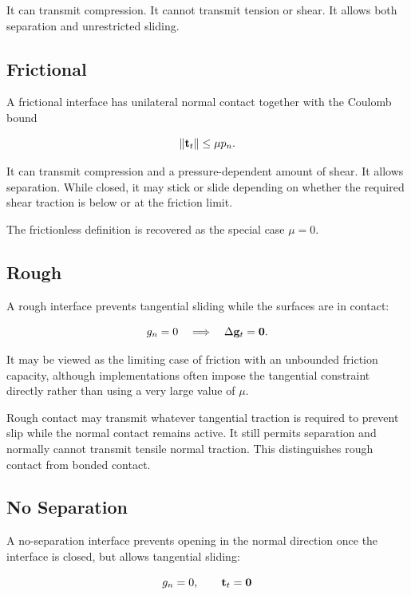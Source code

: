It can transmit compression. It cannot transmit tension or shear. It allows
both separation and unrestricted sliding.

\subsection{Frictional}

A frictional interface has unilateral normal contact together with the Coulomb
bound

\begin{equation}
    \| {\mathbf{t}_t} \| \leq \mu p_n.
\end{equation}

It can transmit compression and a pressure-dependent amount of shear. It allows
separation. While closed, it may stick or slide depending on whether the required
shear traction is below or at the friction limit.

The frictionless definition is recovered as the special case $ \mu=0 $.

\subsection{Rough}

A rough interface prevents tangential sliding while the surfaces are in contact:

\begin{equation}
    g_n=0 \quad \Longrightarrow \quad \Delta \mathbf{g}_t=\mathbf{0}.
\end{equation}

It may be viewed as the limiting case of friction with an unbounded friction
capacity, although implementations often impose the tangential constraint
directly rather than using a very large value of $ \mu $.

Rough contact may transmit whatever tangential traction is required to prevent
slip while the normal contact remains active. It still permits separation and
normally cannot transmit tensile normal traction. This distinguishes rough
contact from bonded contact.

\subsection{No Separation}

A no-separation interface prevents opening in the normal direction once the
interface is closed, but allows tangential sliding:

\begin{equation}\label{contact-no-separation-definition}
    g_n = 0, \qquad \mathbf{t}_t=\mathbf{0}
\end{equation}

